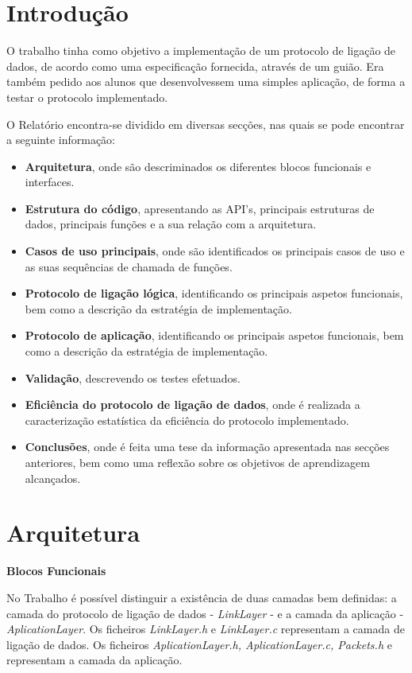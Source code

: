 \documentclass[a4paper, 11pt]{article}
\begin{document}
\section{Introdução}

O trabalho tinha como objetivo a implementação de um protocolo de ligação de dados, de acordo como uma especificação fornecida, através de um guião. Era também pedido aos alunos que desenvolvessem uma simples aplicação, de forma a testar o protocolo implementado.

O Relatório encontra-se dividido em diversas secções, nas quais se pode encontrar a seguinte informação:
\begin{itemize}
	\item \textbf{Arquitetura}, onde são descriminados os diferentes blocos funcionais e interfaces.
	\item \textbf{Estrutura do código}, apresentando as API's, principais estruturas de dados, principais funções e a sua relação com a arquitetura.
	\item \textbf{Casos de uso principais}, onde são identificados os principais casos de uso e as suas sequências de chamada de funções.
	\item \textbf{Protocolo de ligação lógica}, identificando os principais aspetos funcionais, bem como a descrição da estratégia de implementação.
	\item \textbf{Protocolo de aplicação},  identificando os principais aspetos funcionais, bem como a descrição da estratégia de implementação.
	\item \textbf{Validação}, descrevendo os testes efetuados.
	\item \textbf{Eficiência do protocolo de ligação de dados}, onde é realizada a caracterização estatística da eficiência do protocolo implementado.
	\item \textbf{Conclusões}, onde é feita uma tese da informação apresentada nas secções anteriores, bem como uma reflexão sobre os objetivos de aprendizagem alcançados.
\end{itemize}

\section{Arquitetura}

\large\textbf{Blocos Funcionais}\\
\normalsize 

No Trabalho é possível distinguir a existência de duas camadas bem definidas:  a camada do protocolo de ligação de dados - \textit{LinkLayer} - e a camada da aplicação - \textit{AplicationLayer}.
Os ficheiros \textit{LinkLayer.h} e  \textit{LinkLayer.c} representam a camada de ligação de dados. Os ficheiros \textit{AplicationLayer.h, AplicationLayer.c, Packets.h} e  representam a camada da aplicação.
\end{document}
